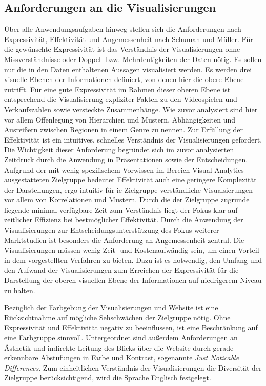 \documentclass[usegeometry=true]{scrartcl}
\begin{document}
\subsection{Anforderungen an die Visualisierungen}
Über alle Anwendungsaufgaben hinweg stellen sich die Anforderungen nach Expressivität, Effektivität und Angemessenheit nach Schuman und Müller.%
Für die gewünschte Expressivität ist das Verständnis der Visualisierungen ohne Missverständnisse oder Doppel- bzw. Mehrdeutigkeiten der Daten nötig. 
Es sollen nur die in den Daten enthaltenen Aussagen visualisiert werden. 
Es werden drei visuelle Ebenen der Informationen definiert, von denen hier die obere Ebene zutrifft.%
Für eine gute Expressivität im Rahmen dieser oberen Ebene ist entsprechend die Visualisierung expliziter Fakten zu den Videospielen und Verkaufszahlen sowie versteckte Zusammenhänge. 
Wie zuvor analysiert sind hier vor allem Offenlegung von Hierarchien und Mustern, Abhängigkeiten und Ausreißern zwischen Regionen in einem Genre zu nennen.
Zur Erfüllung der Effektivität ist ein intuitives, schnelles Verständnis der Visualisierungen gefordert.
Die Wichtigkeit dieser Anforderung begründet sich im zuvor analysierten Zeitdruck durch die Anwendung in Präsentationen sowie der Entscheidungen.
Aufgrund der mit wenig spezifischem Vorwissen im Bereich Visual Analytics ausgestatteten Zielgruppe bedeutet Effektivität auch eine geringere Komplexität der Darstellungen, ergo intuitiv für ie Zielgruppe verständliche Visualsierungen vor allem von Korrelationen und Mustern.
Durch die der Zielgruppe zugrunde liegende minimal verfügbare Zeit zum Verständnis liegt der Fokus klar auf zeitlicher Effizienz bei bestmöglicher Effektivität.
Durch die Anwendung der Visualisierungen zur Entscheidungsunterstützung des Fokus weiterer Marktstudien ist besonders die Anforderung an Angemessenheit zentral. 
Die Visualisierungen müssen wenig Zeit- und Kostenaufwändig sein, um einen Vorteil in dem vorgestellten Verfahren zu bieten. 
Dazu ist es notwendig, den Umfang und den Aufwand der Visualisierungen zum Erreichen der Expressivität für die Darstellung der oberen visuellen Ebene der Informationen auf niedrigerem Niveau zu halten.

Bezüglich der Farbgebung der Visualisierungen und Website ist eine Rücksichtnahme auf mögliche Sehschwächen der Zielgruppe nötig. 
Ohne Expressivität und Effektivität negativ zu beeinflussen, ist eine Beschränkung auf eine Farbgruppe sinnvoll. 
Untergeordnet sind außerdem Anforderungen an Ästhetik und indirekte Leitung des Blicks über die Website durch gerade erkennbare Abstufungen in Farbe und Kontrast, sogenannte \textit{Just Noticable Differences}.
Zum einheitlichen Verständnis der Visualisierungen die Diversität der Zielgruppe berücksichtigend, wird die Sprache Englisch festgelegt.
\end{document}
